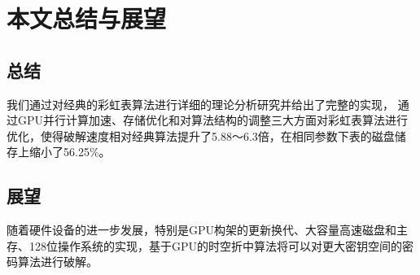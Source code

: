\chapter{本文总结与展望}
\section{总结}
我们通过对经典的彩虹表算法进行详细的理论分析研究并给出了完整的实现，
通过GPU并行计算加速、存储优化和对算法结构的调整三大方面对彩虹表算法进行优化，使得破解速度相对经典算法提升了5.88～6.3倍，在相同参数下表的磁盘储存上缩小了56.25\%。
\section{展望}
随着硬件设备的进一步发展，特别是GPU构架的更新换代、大容量高速磁盘和主存、128位操作系统的实现，基于GPU的时空折中算法将可以对更大密钥空间的密码算法进行破解。
